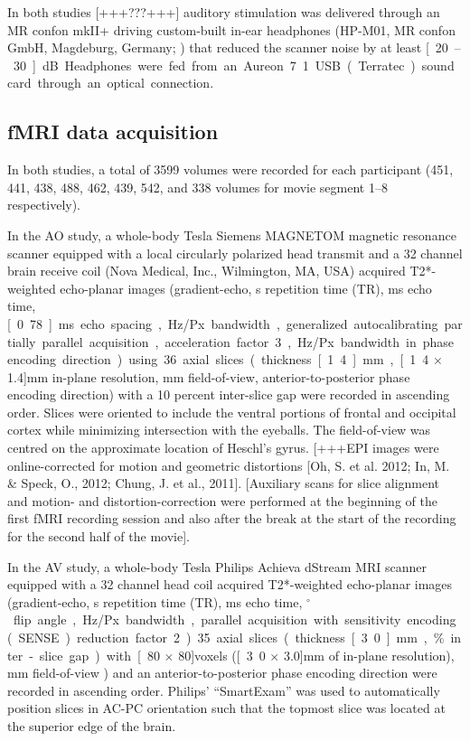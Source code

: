 \documentclass[english]{article}
\begin{document}
In both studies [+++???+++] auditory stimulation was delivered through an MR confon mkII+ driving custom-built in-ear headphones (HP-M01, MR confon GmbH, Magdeburg, Germany; \citep{baumgart1998electrodynamic}) that reduced the scanner noise by at least \unit[20–30]{dB}.
Headphones were  fed from an Aureon 7.1 USB (Terratec) sound card through an optical connection.


\subsection{fMRI data acquisition}
In both studies, a total of 3599 volumes were recorded for each participant (451, 441, 438, 488, 462, 439, 542, and 338 volumes for movie segment 1–8 respectively).

In the AO study, a whole-body \unit[7]{Tesla} Siemens MAGNETOM magnetic resonance scanner equipped with a local circularly polarized head transmit and a 32 channel brain receive coil (Nova Medical, Inc., Wilmington, MA, USA) acquired T2*-weighted echo-planar images
(gradient-echo, \unit[2]{s} repetition time (TR), \unit[22]{ms} echo time, \unit[0.78]{ms} echo spacing, \unit[1488]{Hz/Px} bandwidth, generalized autocalibrating partially parallel acquisition, acceleration factor 3, \unit[2]{Hz/Px} bandwidth in phase encoding direction) using 36 axial slices (thickness \unit[1.4]{mm}, \unit[1.4 $\times$ 1.4]{mm} in-plane resolution, \unit[224]{mm} field-of-view, anterior-to-posterior phase encoding direction)
with a 10 percent inter-slice gap were recorded in ascending order.
Slices were oriented to include the ventral portions of frontal and occipital cortex while minimizing intersection with the eyeballs.
The field-of-view was centred on the approximate location of Heschl's gyrus.
[+++EPI images were online-corrected for motion and geometric distortions [Oh, S. et al. 2012; In, M. \& Speck, O., 2012; Chung, J. et al., 2011].
[Auxiliary scans for slice alignment and motion- and distortion-correction were performed at the beginning of the first fMRI recording session and also after the break at the start of the recording for the second half of the movie].

In the AV study, a whole-body \unit[3]{Tesla} Philips Achieva dStream MRI scanner equipped with a 32 channel head coil acquired T2*-weighted echo-planar images (gradient-echo, \unit[2]{s} repetition time (TR), \unit[30]{ms} echo time, \unit[90]{$^{\circ}$} flip angle, \unit[1943]{Hz/Px} bandwidth, parallel acquisition with sensitivity encoding (SENSE) reduction factor 2).
35 axial slices (thickness \unit[3.0]{mm}, \unit[10]{\%} inter-slice gap) with \unit[80 $\times$ 80]{voxels} (\unit[3.0 $\times$ 3.0]{mm} of in-plane resolution), \unit[240]{mm} field-of-view ) and an anterior-to-posterior phase encoding direction were recorded in ascending order.
Philips' ``SmartExam'' was used to automatically position slices in AC-PC orientation such that the topmost slice was located at the superior edge of the brain.
\end{document}
